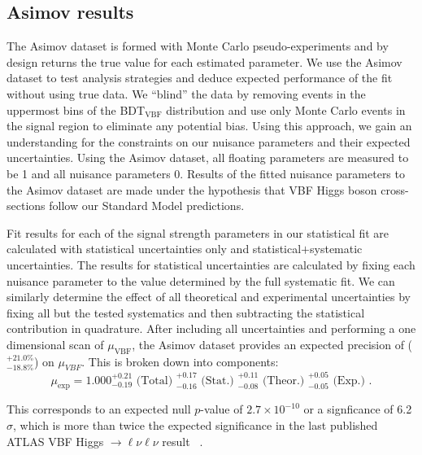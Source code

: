 \subsection{Asimov results}
The Asimov dataset is formed with Monte Carlo pseudo-experiments and by design returns the true value for each estimated parameter. We use the Asimov dataset to test analysis strategies and deduce expected performance of the fit without using true data. We ``blind'' the data by removing events in the uppermost bins of the BDT$_{\text{VBF}}$ distribution and use only Monte Carlo events in the signal region to eliminate any potential bias. Using this approach, we gain an understanding for the constraints on our nuisance parameters and their expected uncertainties. Using the Asimov dataset, all floating parameters are measured to be 1 and all nuisance parameters 0. Results of the fitted nuisance parameters to the Asimov dataset are made under the hypothesis that VBF Higgs boson cross-sections follow our Standard Model predictions. 

Fit results for each of the signal strength parameters in our statistical fit are calculated with statistical uncertainties only and statistical$+$systematic uncertainties. The results for statistical uncertainties are calculated by fixing each nuisance parameter to the value determined by the full systematic fit. We can similarly determine the effect of all theoretical and experimental uncertainties by fixing all but the tested systematics and then subtracting the statistical contribution in quadrature. After including all uncertainties and performing a one dimensional scan of $\mu_\text{VBF}$, the Asimov dataset provides an expected precision of ($^{+21.0\%}_{-18.8\%}$) on $\mu_{VBF}$. This is broken down into components:
\begin{equation}
\mu_{\text{exp}} = 1.000 ^{+0.21}_{-0.19} \text{ (Total) } ^{+0.17}_{-0.16} \text{ (Stat.) } ^{+0.11}_{-0.08} \text{ (Theor.) } ^{+0.05}_{-0.05} \text{ (Exp.) }.
\end{equation}

This corresponds to an expected null $p$-value of $2.7\times10^{-10}$ or a signficance of 6.2$\sigma$, which is more than twice the expected significance in the last published ATLAS VBF Higgs $\rightarrow \ell\nu\ell\nu$ result ~\cite{Aaboud_2019}.   

